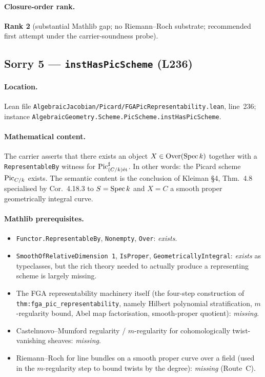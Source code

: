 \paragraph{Closure-order rank.} \textbf{Rank 2} (substantial Mathlib
gap; no Riemann--Roch substrate; recommended first attempt under the
carrier-soundness probe).

\subsection{Sorry 5 --- \texttt{instHasPicScheme} (L236)}
\label{subsec:sorry_has_pic_scheme}

\paragraph{Location.} Lean file
\texttt{AlgebraicJacobian/Picard/FGAPicRepresentability.lean},
line~236; instance
\texttt{AlgebraicGeometry.Scheme.PicScheme.instHasPicScheme}.

\paragraph{Mathematical content.} The carrier asserts that there
exists an object $X \in \mathrm{Over}(\operatorname{Spec} k)$ together with a
\texttt{RepresentableBy} witness for $\operatorname{Pic}^\sharp_{(C/k)\mathrm{\acute{e}t}}$. In
other words: the Picard scheme $\operatorname{Pic}_{C/k}$ exists. The semantic
content is the conclusion of Kleiman \S4, Thm.~4.8
specialised by Cor.~4.18.3 to $S = \operatorname{Spec} k$ and $X = C$
a smooth proper geometrically integral curve.

\paragraph{Mathlib prerequisites.}
\begin{itemize}
  \item \texttt{Functor.RepresentableBy}, \texttt{Nonempty},
    \texttt{Over}: \emph{exists}.
  \item \texttt{SmoothOfRelativeDimension 1},
    \texttt{IsProper}, \texttt{GeometricallyIntegral}: \emph{exists}
    as typeclasses, but the rich theory needed to actually produce a
    representing scheme is largely missing.
  \item The FGA representability machinery itself (the four-step
    construction of \texttt{thm:fga_pic_representability}, namely
    Hilbert polynomial stratification, $m$-regularity bound, Abel
    map factorisation, smooth-proper quotient): \emph{missing}.
  \item Castelnuovo--Mumford regularity / $m$-regularity for
    cohomologically twist-vanishing sheaves: \emph{missing}.
  \item Riemann--Roch for line bundles on a smooth proper curve over
    a field (used in the $m$-regularity step to bound twists by the
    degree): \emph{missing} (Route~C).
\end{itemize}

